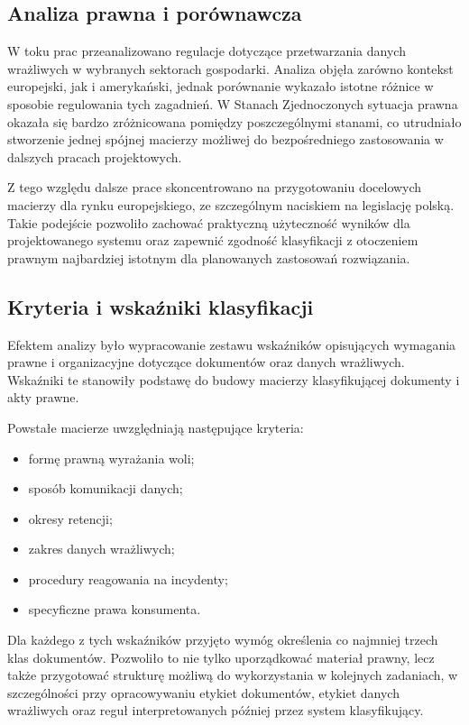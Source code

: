 \documentclass[12pt,a4paper]{report}
\begin{document}
\subsection{Analiza prawna i porównawcza}
W toku prac przeanalizowano regulacje dotyczące przetwarzania danych wrażliwych w wybranych sektorach gospodarki. Analiza objęła zarówno kontekst europejski, jak i amerykański, jednak porównanie wykazało istotne różnice w sposobie regulowania tych zagadnień. W Stanach Zjednoczonych sytuacja prawna okazała się bardzo zróżnicowana pomiędzy poszczególnymi stanami, co utrudniało stworzenie jednej spójnej macierzy możliwej do bezpośredniego zastosowania w dalszych pracach projektowych.

Z tego względu dalsze prace skoncentrowano na przygotowaniu docelowych macierzy dla rynku europejskiego, ze szczególnym naciskiem na legislację polską. Takie podejście pozwoliło zachować praktyczną użyteczność wyników dla projektowanego systemu oraz zapewnić zgodność klasyfikacji z otoczeniem prawnym najbardziej istotnym dla planowanych zastosowań rozwiązania.

\subsection{Kryteria i wskaźniki klasyfikacji}
Efektem analizy było wypracowanie zestawu wskaźników opisujących wymagania prawne i organizacyjne dotyczące dokumentów oraz danych wrażliwych. Wskaźniki te stanowiły podstawę do budowy macierzy klasyfikującej dokumenty i akty prawne.

Powstałe macierze uwzględniają następujące kryteria:

\begin{itemize}
    \item formę prawną wyrażania woli;
    \item sposób komunikacji danych;
    \item okresy retencji;
    \item zakres danych wrażliwych;
    \item procedury reagowania na incydenty;
    \item specyficzne prawa konsumenta.
\end{itemize}

Dla każdego z tych wskaźników przyjęto wymóg określenia co najmniej trzech klas dokumentów. Pozwoliło to nie tylko uporządkować materiał prawny, lecz także przygotować strukturę możliwą do wykorzystania w kolejnych zadaniach, w szczególności przy opracowywaniu etykiet dokumentów, etykiet danych wrażliwych oraz reguł interpretowanych później przez system klasyfikujący.
\end{document}
